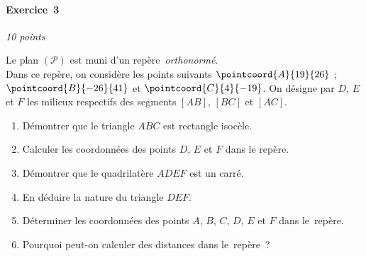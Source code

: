 \vspace*{1em}

\begin{minipage}{0.45\textwidth}
\thispagestyle{sujet1}

\vspace*{1em}

%


\paragraph{Exercice~3} \hfill \emph{10 points}

Le plan $\left(\mathscr{P}\right)$ est muni d'un repère~\emph{orthonormé}.\\ Dans ce repère, on considère les points suivants $\pointcoord{A}{19}{26}$ ; $\pointcoord{B}{-26}{41}$ et $\pointcoord{C}{4}{-19}$.
On désigne par $D$, $E$ et $F$ les milieux respectifs des segments $\left[AB\right]$,  $\left[BC\right]$ et $\left[AC\right]$.

\begin{enumerate}
	\item Démontrer que le triangle $ABC$ est rectangle isocèle.
	\item Calculer les coordonnées des points $D$, $E$ et $F$ dans le repère.
	\item Démontrer que le quadrilatère $ADEF$ est un carré.
	\item En déduire la nature du triangle $DEF$.
	\item Déterminer les coordonnées des points $A$, $B$, $C$, $D$, $E$ et $F$ dans le~repère.
	\item Pourquoi peut-on calculer des distances dans le~repère~?
\end{enumerate}

\vspace*{2em}

\centering
{}


\end{minipage}